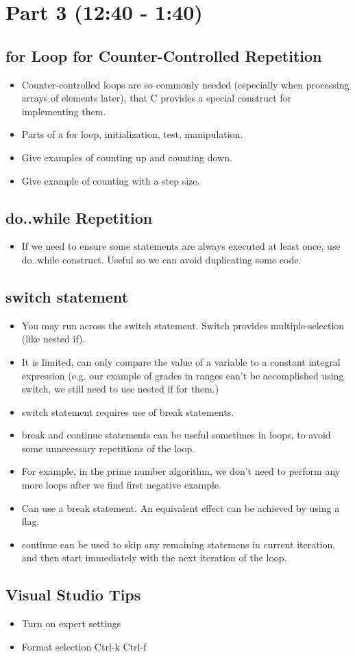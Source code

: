 \documentclass[11pt]{article}
\begin{document}
\section*{Part 3 (12:40 - 1:40)}
\label{sec-3}
\subsection*{for Loop for Counter-Controlled Repetition}
\label{sec-3-1}

\begin{itemize}
\item Counter-controlled loops are so commonly needed (especially when
  processing arrays of elements later), that C provides a special
  construct for implementing them.
\item Parts of a for loop, initialization, test, manipulation.
\item Give examples of counting up and counting down.
\item Give example of counting with a step size.
\end{itemize}
\subsection*{do..while Repetition}
\label{sec-3-2}

\begin{itemize}
\item If we need to ensure some statements are always executed at least
  once, use do..while construct.  Useful so we can avoid duplicating
  some code.
\end{itemize}
\subsection*{switch statement}
\label{sec-3-3}

\begin{itemize}
\item You may run across the switch statement.  Switch provides multiple-selection (like nested if).
\item It is limited, can only compare the value of a variable to a
  constant integral expression (e.g. our example of grades in ranges
  can't be accomplished using switch, we still need to use nested if
  for them.)
\item switch statement requires use of break statements.
\item break and continue statements can be useful sometimes in loops, to
  avoid some unnecessary repetitions of the loop.
\item For example, in the prime number algorithm, we don't need to perform
  any more loops after we find first negative example.
\item Can use a break statement.  An equivalent effect can be achieved by using a flag.
\item continue can be used to skip any remaining statemens in current
  iteration, and then start immediately with the next iteration of the
  loop.
\end{itemize}
\subsection*{Visual Studio Tips}
\label{sec-3-4}

\begin{itemize}
\item Turn on expert settings
\item Format selection Ctrl-k Ctrl-f
\end{itemize}
\end{document}
